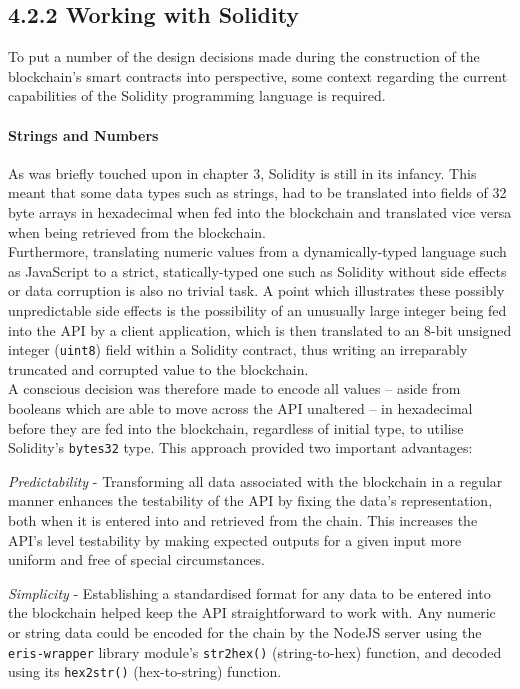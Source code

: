 \documentclass[12pt]{report}
\let\oldparagraph\paragraph
\renewcommand{\paragraph}[1]{\oldparagraph{#1}\mbox{}}
\begin{document}
\subsection{4.2.2 Working with Solidity}\label{working-with-solidity}

To put a number of the design decisions made during the construction of
the blockchain's smart contracts into perspective, some context
regarding the current capabilities of the Solidity programming language
is required.

\paragraph{Strings and Numbers}\label{strings-and-numbers}

As was briefly touched upon in chapter 3, Solidity is still in its
infancy. This meant that some data types such as strings, had to be
translated into fields of 32 byte arrays in hexadecimal when fed into
the blockchain and translated vice versa when being retrieved from the
blockchain.\\
Furthermore, translating numeric values from a dynamically-typed
language such as JavaScript to a strict, statically-typed one such as
Solidity without side effects or data corruption is also no trivial
task. A point which illustrates these possibly unpredictable side
effects is the possibility of an unusually large integer being fed into
the API by a client application, which is then translated to an 8-bit
unsigned integer (\texttt{uint8}) field within a Solidity contract, thus
writing an irreparably truncated and corrupted value to the
blockchain.\\
A conscious decision was therefore made to encode all values -- aside
from booleans which are able to move across the API unaltered -- in
hexadecimal before they are fed into the blockchain, regardless of
initial type, to utilise Solidity's \texttt{bytes32} type. This approach
provided two important advantages:

\emph{Predictability} - Transforming all data associated with the
blockchain in a regular manner enhances the testability of the API by
fixing the data's representation, both when it is entered into and
retrieved from the chain. This increases the API's level testability by
making expected outputs for a given input more uniform and free of
special circumstances.

\emph{Simplicity} - Establishing a standardised format for any data to
be entered into the blockchain helped keep the API straightforward to
work with. Any numeric or string data could be encoded for the chain by
the NodeJS server using the \texttt{eris-wrapper} library module's
\texttt{str2hex()} (string-to-hex) function, and decoded using its
\texttt{hex2str()} (hex-to-string) function.
\end{document}
